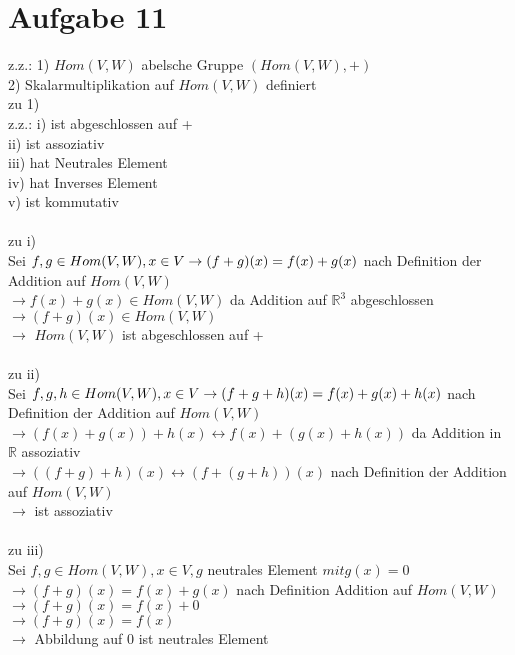 \section*{Aufgabe 11}
z.z.: 1) $Hom(V,W)$ abelsche Gruppe $(Hom(V,W),+)$\\
2) Skalarmultiplikation auf $Hom(V,W)$ definiert\\
zu 1)\\ z.z.: i) ist abgeschlossen auf +\\
ii) ist assoziativ\\
iii) hat Neutrales Element\\
iv) hat Inverses Element\\
v) ist kommutativ\\\\
zu i)\\
Sei $f,g \in Hom(V,W), x \in V\\
\rightarrow (f + g)(x) = f(x) + g(x)$ nach Definition der Addition auf $Hom(V,W)$\\
$\rightarrow f(x) + g(x) \in Hom(V,W)$ da Addition auf $\mathbb{R}^3$ abgeschlossen\\
$\rightarrow (f + g)(x) \in Hom(V,W)$\\
$\rightarrow$ $Hom(V,W)$ ist abgeschlossen auf +\\\\
zu ii)\\
Sei $f,g,h \in Hom(V,W), x \in V\\
\rightarrow (f + g + h)(x) = f(x) + g(x) + h(x)$ nach Definition der Addition auf $Hom(V,W)$\\
$\rightarrow (f(x) + g(x)) + h(x) \leftrightarrow f(x) + (g(x) + h(x))$ da Addition in $\mathbb{R}$ assoziativ\\
$\rightarrow ((f + g) + h)(x) \leftrightarrow (f + (g + h))(x)$ nach Definition der Addition auf $Hom(V,W)$\\
$\rightarrow$ ist assoziativ\\\\
zu iii)\\
Sei $f,g \in Hom(V,W), x \in V, g$ neutrales Element $ mit g(x) = 0$\\
$\rightarrow (f + g)(x) = f(x) + g(x)$ nach Definition Addition auf $Hom(V,W)$\\
$\rightarrow (f + g)(x) = f(x) + 0$\\
$\rightarrow (f + g)(x) = f(x)$\\
$\rightarrow$ Abbildung auf 0 ist neutrales Element\\
